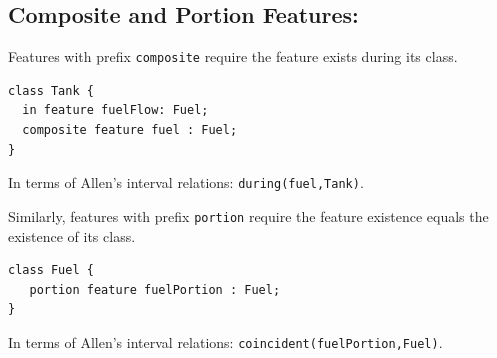\subsection{Composite and Portion Features:}\label{par:cnp}

\pn Features with prefix \texttt{composite} require the feature exists during its class.
\begin{lstlisting}
class Tank {
  in feature fuelFlow: Fuel; 
  composite feature fuel : Fuel;
}
\end{lstlisting}
In terms of Allen's interval relations:  \texttt{during(fuel,Tank)}.

\pn Similarly, features with prefix \texttt{portion} require the feature existence equals the existence of its class.
\begin{lstlisting}
class Fuel {
   portion feature fuelPortion : Fuel;
}
\end{lstlisting}
In terms of Allen's interval relations:  \texttt{coincident(fuelPortion,Fuel)}.


%
%


%
%
%

